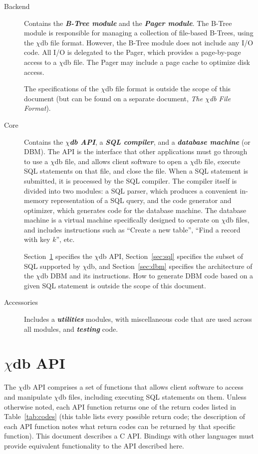 \documentclass[10pt]{article}
\newcommand{\chidb}{$\chi$\textsf{db}}
\begin{document}
\begin{description}
\item[Backend] Contains the \emph{\textbf{B-Tree module}} and the \emph{\textbf{Pager module}}. The B-Tree module is responsible for managing a collection of file-based B-Trees, using the \chidb{} file format. However, the B-Tree module does not include any I/O code. All I/O is delegated to the Pager, which provides a page-by-page access to a \chidb{} file. The Pager may include a page cache to optimize disk access.

The specifications of the \chidb{} file format is outside the scope of this document (but can be found on a separate document, \emph{The \chidb{} File Format}).

\item[Core] Contains the \emph{\textbf{\chidb{} API}}, a \emph{\textbf{SQL compiler}}, and a \emph{\textbf{database machine}} (or DBM). The API is the interface that other applications must go through to use a \chidb{} file, and allows client software to open a \chidb{} file, execute SQL statements on that file, and close the file. When a SQL statement is submitted, it is processed by the SQL compiler. The compiler itself is divided into two modules: a SQL parser, which produces a convenient in-memory representation of a SQL query, and the code generator and optimizer, which generates code for the database machine. The database machine is a virtual machine specifically designed to operate on \chidb{} files, and includes instructions such as ``Create a new table'', ``Find a record with key $k$'', etc.

Section~\ref{sec:api} specifies the \chidb{} API, Section~\ref{sec:sql} specifies the subset of SQL supported by \chidb{}, and Section~\ref{sec:dbm} specifies the architecture of the \chidb{} DBM and its instructions. How to generate DBM code based on a given SQL statement is outside the scope of this document.

\item[Accessories] Includes a \emph{\textbf{utilities}} modules, with miscellaneous code that are used across all modules, and \emph{\textbf{testing}} code.
\end{description}


\section{\chidb{} API}
\label{sec:api}

The \chidb{} API comprises a set of functions that allows client software to access and manipulate \chidb{} files, including executing SQL statements on them. Unless otherwise noted, each API function returns one of the return codes listed in Table~\ref{tab:codes} (this table lists every possible return code; the description of each API function notes what return codes can be returned by that specific function). This document describes a C API. Bindings with other languages must provide equivalent functionality to the API described here.
\end{document}
